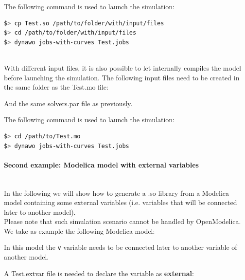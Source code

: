 \documentclass[a4paper, 12pt]{report}
\begin{document}
The following command is used to launch the simulation:
\begin{lstlisting}[language=bash,deletekeywords={jobs,help}]
$> cp Test.so /path/to/folder/with/input/files
$> cd /path/to/folder/with/input/files
$> dynawo jobs-with-curves Test.jobs
\end{lstlisting}

~~\\
With different input files, it is also possible to let \Dynawo
internally compiles the model before launching the simulation. The following input files need to be created in the same folder as the Test.mo file:




And the same solvers.par file as previously.

The following command is used to launch the simulation:
\begin{lstlisting}[language=bash,deletekeywords={jobs,help}]
$> cd /path/to/Test.mo
$> dynawo jobs-with-curves Test.jobs
\end{lstlisting}

\paragraph{Second example: Modelica model with external variables}
\label{Dynawo_Advanced_Documentation_Dynawo_executables_execDynawo_second_example}
~~\\
In the following we will show how to generate a .so library from a
Modelica model containing some external variables (i.e. variables that will be connected later to another model). \\

Please note that such simulation scenario cannot be handled by OpenModelica. \\

We take as example the following Modelica model:

In this model the \lstinline[language=Modelica]{v} variable needs to be connected later to another variable of another model.

A Test.extvar file is needed to declare the variable as \textbf{external}:
\end{document}
